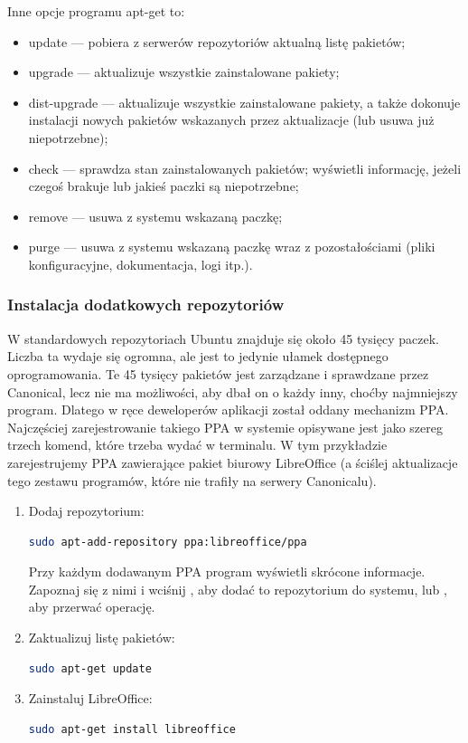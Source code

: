 Inne opcje programu apt-get to:

\begin{itemize}
\item \textcolor{ubuntu_orange}{update} --- pobiera z serwerów repozytoriów aktualną listę pakietów;
\item \textcolor{ubuntu_orange}{upgrade} --- aktualizuje wszystkie zainstalowane pakiety;
\item \textcolor{ubuntu_orange}{dist-upgrade} --- aktualizuje wszystkie zainstalowane pakiety, a także dokonuje instalacji nowych pakietów wskazanych przez aktualizacje (lub usuwa już niepotrzebne);
\item \textcolor{ubuntu_orange}{check} --- sprawdza stan zainstalowanych pakietów; wyświetli informację, jeżeli czegoś brakuje lub jakieś paczki są niepotrzebne;
\item \textcolor{ubuntu_orange}{remove} --- usuwa z systemu wskazaną paczkę;
\item \textcolor{ubuntu_orange}{purge} --- usuwa z systemu wskazaną paczkę wraz z pozostałościami (pliki konfiguracyjne, dokumentacja, logi itp.).
\end{itemize}

\subsubsection{Instalacja dodatkowych repozytoriów}
W standardowych repozytoriach Ubuntu znajduje się około 45 tysięcy paczek. Liczba ta wydaje się ogromna, ale jest to jedynie ułamek dostępnego oprogramowania. Te 45 tysięcy pakietów jest zarządzane i sprawdzane przez Canonical, lecz nie ma możliwości, aby dbał on o każdy inny, choćby najmniejszy program. Dlatego w ręce deweloperów aplikacji został oddany mechanizm PPA. Najczęściej zarejestrowanie takiego PPA w systemie opisywane jest jako szereg trzech komend, które trzeba wydać w terminalu. W tym przykładzie zarejestrujemy PPA zawierające pakiet biurowy LibreOffice (a ściślej aktualizacje tego zestawu programów, które nie trafiły na serwery Canonicalu).
\begin{enumerate}
\item Dodaj repozytorium:
\begin{lstlisting}[language=bash]
sudo apt-add-repository ppa:libreoffice/ppa
\end{lstlisting}
Przy każdym dodawanym PPA program wyświetli skrócone informacje. Zapoznaj się z nimi i wciśnij \keys{\returnwin}, aby dodać to repozytorium do systemu, lub , aby przerwać operację.
\item Zaktualizuj listę pakietów:
\begin{lstlisting}[language=bash]
sudo apt-get update
\end{lstlisting}
\item Zainstaluj LibreOffice:
\begin{lstlisting}[language=bash]
sudo apt-get install libreoffice
\end{lstlisting}
\end{enumerate}

